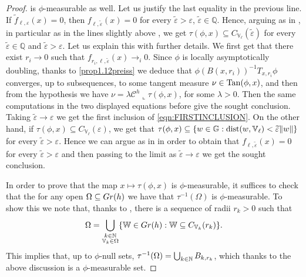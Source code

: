 \documentclass[10pt, a4paper,
oneside, headinclude,footinclude]{scrartcl}
\begin{document}
\begin{proof}
is $\phi$-measurable as well. Let us justify the last equality in the previous line. If $\widetilde f_{\ell,\varepsilon}(x)=0$, then $f_{\ell,\widetilde{\varepsilon}}(x)=0$ for every $\widetilde{\varepsilon}>\varepsilon$, $\widetilde\varepsilon\in\mathbb Q$. Hence, arguing as in \cite[Proof of Proposition 5.5]{antonelli2020rectifiable}, in particular as in the lines slightly above \cite[Equation (109)]{antonelli2020rectifiable}, we get $\tau(\phi,x) \subseteq C_{\mathbb V_\ell}(\widetilde{\varepsilon})$ for every $\widetilde\varepsilon\in\mathbb Q$ and $\widetilde\varepsilon>\varepsilon$. Let us explain this with further details. We first get that there exist $r_i\to 0$ such that $f_{r_i,\ell,\widetilde\varepsilon}(x)\to_{i}0$. Since $\phi$ is locally asymptotically doubling, thanks to \cref{prop1.12preiss} we deduce that $\phi(B(x,r_i))^{-1}T_{x,r_i}\phi$ converges, up to subsequences, to some tangent measure $\nu\in \mathrm{Tan}(\phi,x)$, and then from the hypothesis we have $\nu=\lambda\mathcal{C}^h\llcorner\tau(\phi,x)$, for some $\lambda>0$. Then the same computations in the two displayed equations before \cite[Equation (109)]{antonelli2020rectifiable} give the sought conclusion. Taking $\widetilde\varepsilon\to\varepsilon$ we get the first inclusion of \eqref{eqn:FIRSTINCLUSION}. On the other hand, if $\tau(\phi,x) \subseteq C_{\mathbb V_\ell}(\varepsilon)$, we get that $\tau(\phi,x)\subseteq \{w\in\mathbb G:\operatorname*{dist}(w,\mathbb V_\ell)<\widetilde\varepsilon\|w\|\}$ for every $\widetilde\varepsilon>\varepsilon$. Hence we can argue as in \cite[Equation (111)]{antonelli2020rectifiable} in order to obtain that $f_{\ell,\widetilde\varepsilon}(x)=0$ for every $\widetilde\varepsilon>\varepsilon$ and then passing to the limit as $\widetilde\varepsilon\to\varepsilon$ we get the sought conclusion.

In order to prove that the map $x\mapsto \tau(\phi,x)$ is $\phi$-measurable, it suffices to check that the for any open $\Omega\subseteq Gr(h)$ we have that $\tau^{-1}(\Omega)$ is $\phi$-measurable. To show this we note that, thanks to \cite[Lemma 2.15]{antonelli2020rectifiable}, there is a sequence of radii $r_k>0$ such that
$$
\Omega=\bigcup_{\substack{k\in\mathbb{N}\\ \mathbb{V}_k\in\Omega}} \{\mathbb{W}\in Gr(h):\mathbb W\subseteq C_{\mathbb V_k}(r_k)\}.
$$
This implies that, up to $\phi$-null sets, $\tau^{-1}(\Omega)= \bigcup_{k\in\mathbb{N}} B_{k,r_k}$,
which thanks to the above discussion is a $\phi$-measurable set.
\end{proof}
\end{document}
